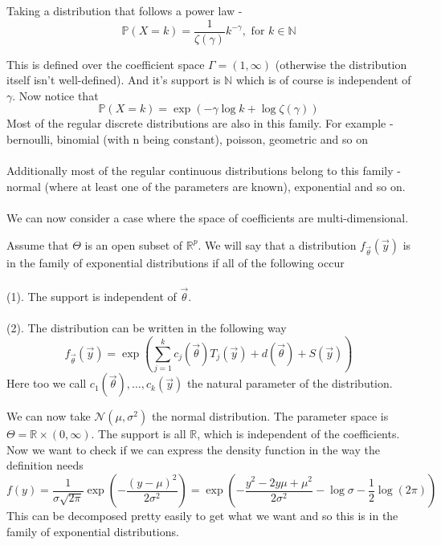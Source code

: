 \documentclass[../main.tex]{subfiles}
\begin{document}
\begin{example}
Taking a distribution that follows a power law - 
\[\mathbb{P}(X=k) =\frac{1}{\zeta(\gamma)} k^{-\gamma}, \text{ for } k\in\mathbb{N}\]
\end{example}
This is defined over the coefficient space $\Gamma = (1,\infty)$ (otherwise the distribution itself isn't well-defined). And it's support is $\mathbb{N}$ which is of course is independent of $\gamma$. Now notice that
\[\mathbb{P}(X=k)=\exp\left(-\gamma\log k + \log\zeta(\gamma)\right)\]
Most of the regular discrete distributions are also in this family. For example - bernoulli, binomial (with n being constant), poisson, geometric and so on\\\\
Additionally most of the regular continuous distributions belong to this family - normal (where at least one of the parameters are known), exponential and so on. \\\\
We can now consider a case where the space of coefficients are multi-dimensional.
\newpage
\begin{definition}
Assume that $\Theta$ is an open subset of $\mathbb{R}^p$. We will say that a distribution $f_{\overrightarrow{\theta}}(\overrightarrow{y})$ is in the family of exponential distributions if all of the following occur \\\\
(1). The support is independent of $\overrightarrow{\theta}$. \\\\
(2). The distribution can be written in the following way
\[f_{\overrightarrow{\theta}}(\overrightarrow{y}) = \exp\left(\sum_{j=1}^k c_j(\overrightarrow{\theta})T_j(\overrightarrow{y}) + d(\overrightarrow{\theta}) + S(\overrightarrow{y})\right)\]
Here too we call $c_1(\overrightarrow{\theta}),\dots,c_k(\overrightarrow{y})$ the natural parameter of the distribution.
\end{definition}
\begin{example}
We can now take $\mathcal{N}(\mu,\sigma^2)$ the normal distribution. The parameter space is $\Theta = \mathbb{R}\times (0,\infty)$. The support is all $\mathbb{R}$, which is independent of the coefficients. Now we want to check if we can express the density function in the way the definition needs 
\[f(y) = \frac{1}{\sigma\sqrt{2\pi}} \exp\left(-\frac{(y-\mu)^2}{2\sigma^2}\right)=\exp\left(-\frac{y^2-2y\mu+\mu^2}{2\sigma^2} -\log\sigma-\frac{1}{2} \log(2\pi)\right)\]
This can be decomposed pretty easily to get what we want and so this is in the family of exponential distributions. 
\end{example}
\end{document}
